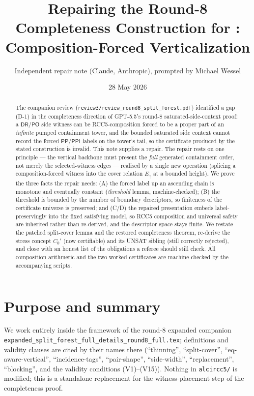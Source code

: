 \documentclass[11pt]{article}
\title{Repairing the Round-8 Completeness Construction for \texorpdfstring{\ALCIRCC}{ALCI-RCC5}:\\
Composition-Forced Verticalization}
\author{Independent repair note (Claude, Anthropic), prompted by Michael Wessel}
\date{28 May 2026}
\newcommand{\DR}{\mathsf{DR}}
\newcommand{\PO}{\mathsf{PO}}
\newcommand{\PP}{\mathsf{PP}}
\newcommand{\PPI}{\mathsf{PPI}}
\newcommand{\Eup}{E_{\uparrow}}
\begin{document}
\maketitle

\begin{abstract}
The companion review (\texttt{review3/review\_round8\_split\_forest.pdf})
identified a gap (D-1) in the completeness direction of GPT-5.5's round-8
saturated-side-context proof: a $\DR/\PO$ side witness can be RCC5-composition
forced to be a proper part of an \emph{infinite} pumped containment tower, and
the bounded saturated side context cannot record the forced $\PP/\PPI$ labels on
the tower's tail, so the certificate produced by the stated construction is
invalid.  This note supplies a repair.  The repair rests on one principle ---
the vertical backbone must present the \emph{full} generated containment order,
not merely the selected-witness edges --- realised by a single new operation
(splicing a composition-forced witness into the cover relation $\Eup$ at a
bounded height).  We prove the three facts the repair needs: (A) the forced
label up an ascending chain is monotone and eventually constant
(\emph{threshold} lemma, machine-checked); (B) the threshold is bounded by the
number of boundary descriptors, so finiteness of the certificate universe is
preserved; and (C/D) the repaired presentation embeds label-preservingly into
the fixed satisfying model, so RCC5 composition and universal safety are
inherited rather than re-derived, and the descriptor space stays finite.  We
restate the patched split-cover lemma and the restored completeness theorem,
re-derive the stress concept $C_0'$ (now certifiable) and its UNSAT sibling
(still correctly rejected), and close with an honest list of the obligations a
referee should still check.  All composition arithmetic and the two worked
certificates are machine-checked by the accompanying scripts.
\end{abstract}

\tableofcontents

\section{Purpose and summary}

We work entirely inside the framework of the round-8 expanded companion
\texttt{expanded\_split\_forest\_full\_details\_round8\_full.tex}; definitions and
validity clauses are cited by their names there
(``thinning'', ``split-cover'', ``eq-aware-vertical'', ``incidence-tags'',
``pair-shape'', ``side-width'', ``replacement'', ``blocking'', and the validity
conditions (V1)--(V15)).  Nothing in \texttt{alcircc5/} is modified; this is a
standalone replacement for the witness-placement step of the completeness proof.
\end{document}

